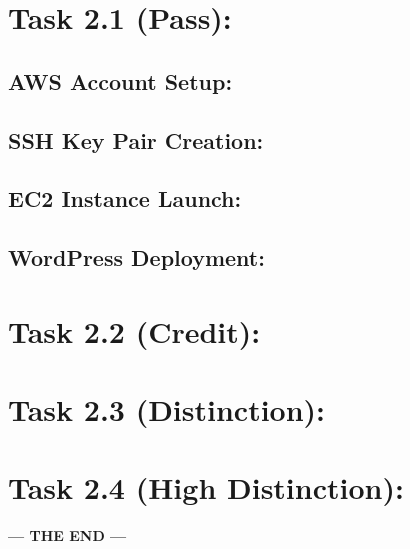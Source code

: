 \documentclass[11pt,a4paper]{article}
\begin{document}
\section*{Task 2.1 (Pass):}

\subsection{AWS Account Setup:}

\subsection{SSH Key Pair Creation:}

\subsection{EC2 Instance Launch:}

\subsection{WordPress Deployment:}

\section*{Task 2.2 (Credit):}

\section*{Task 2.3 (Distinction):}

\section*{Task 2.4 (High Distinction):}

\vspace{20pt}
\begin{center}
\textbf{--- THE END ---}    
\end{center}
\end{document}
